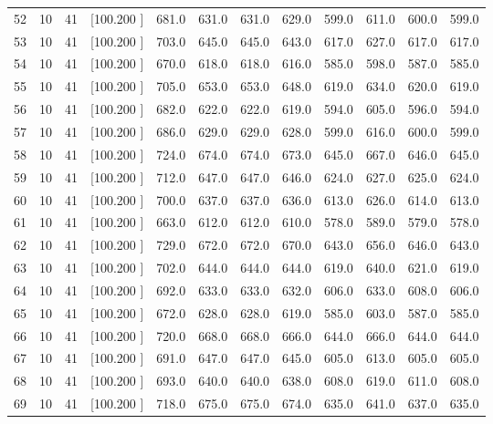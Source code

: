 \documentclass[12pt,a4paper]{article}
\begin{document}
\begin{center}
{\begin{tabular}{r r r r r r r r r r r r}
  52& 10& 41&[100.200   ]&   681.0&   631.0&   631.0&   629.0&   599.0&   611.0&   600.0&   599.0\\[-0.02in]
  53& 10& 41&[100.200   ]&   703.0&   645.0&   645.0&   643.0&   617.0&   627.0&   617.0&   617.0\\[-0.02in]
  54& 10& 41&[100.200   ]&   670.0&   618.0&   618.0&   616.0&   585.0&   598.0&   587.0&   585.0\\[-0.02in]
  55& 10& 41&[100.200   ]&   705.0&   653.0&   653.0&   648.0&   619.0&   634.0&   620.0&   619.0\\[-0.02in]
  56& 10& 41&[100.200   ]&   682.0&   622.0&   622.0&   619.0&   594.0&   605.0&   596.0&   594.0\\[-0.02in]
  57& 10& 41&[100.200   ]&   686.0&   629.0&   629.0&   628.0&   599.0&   616.0&   600.0&   599.0\\[-0.02in]
  58& 10& 41&[100.200   ]&   724.0&   674.0&   674.0&   673.0&   645.0&   667.0&   646.0&   645.0\\[-0.02in]
  59& 10& 41&[100.200   ]&   712.0&   647.0&   647.0&   646.0&   624.0&   627.0&   625.0&   624.0\\[-0.02in]
  60& 10& 41&[100.200   ]&   700.0&   637.0&   637.0&   636.0&   613.0&   626.0&   614.0&   613.0\\[-0.02in]
  61& 10& 41&[100.200   ]&   663.0&   612.0&   612.0&   610.0&   578.0&   589.0&   579.0&   578.0\\[-0.02in]
  62& 10& 41&[100.200   ]&   729.0&   672.0&   672.0&   670.0&   643.0&   656.0&   646.0&   643.0\\[-0.02in]
  63& 10& 41&[100.200   ]&   702.0&   644.0&   644.0&   644.0&   619.0&   640.0&   621.0&   619.0\\[-0.02in]
  64& 10& 41&[100.200   ]&   692.0&   633.0&   633.0&   632.0&   606.0&   633.0&   608.0&   606.0\\[-0.02in]
  65& 10& 41&[100.200   ]&   672.0&   628.0&   628.0&   619.0&   585.0&   603.0&   587.0&   585.0\\[-0.02in]
  66& 10& 41&[100.200   ]&   720.0&   668.0&   668.0&   666.0&   644.0&   666.0&   644.0&   644.0\\[-0.02in]
  67& 10& 41&[100.200   ]&   691.0&   647.0&   647.0&   645.0&   605.0&   613.0&   605.0&   605.0\\[-0.02in]
  68& 10& 41&[100.200   ]&   693.0&   640.0&   640.0&   638.0&   608.0&   619.0&   611.0&   608.0\\[-0.02in]
  69& 10& 41&[100.200   ]&   718.0&   675.0&   675.0&   674.0&   635.0&   641.0&   637.0&   635.0\\[-0.02in]

\end{tabular}}
\end{center}
\end{document}
